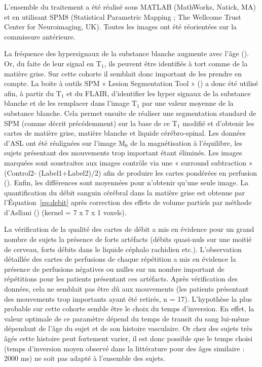 L’ensemble du traitement a été réalisé sous MATLAB (MathWorks, Natick, MA) et en utilisant
SPM8 (Statistical Parametric Mapping ; The Wellcome Trust Center for Neuroimaging, UK). Toutes les
images ont été réorientées sur la commissure antérieure.

La fréquence des hypersignaux de la substance blanche augmente avec l’âge (\cite{Awad1987}). Or, du faite
de leur signal en T$_1$, ils peuvent être identifiés à tort comme de la matière grise. Sur cette cohorte il
semblait donc important de les prendre en compte. La boite à outils SPM « Lesion Segmentation Tool »
(\cite{Schmidt2012}) a donc été utilisé afin, à partir du T$_1$ et du FLAIR, d’identifier les hyper signaux de la substance
blanche et de les remplacer dans l’image T$_1$ par une valeur moyenne de la substance blanche. Cela
permet ensuite de réaliser une segmentation standard de SPM (comme décrit précédemment) sur la
base de ce T$_1$ modifié et d’obtenir les cartes de matière grise, matière blanche et liquide cérébro-spinal. Les données d’ASL ont été réalignées sur l’image M$_0$ de la magnétisation à l’équilibre, les sujets
présentant des mouvements trop important étant éliminés. Les images marquées sont soustraites aux
images contrôle via une « surround subtraction » (Control2- (Label1+Label2)/2) afin de produire les
cartes pondérées en perfusion (\cite{Wang2008}). Enfin, les différences sont moyennées pour n’obtenir qu’une
seule image. La quantification du débit sanguin cérébral dans la matière grise est obtenue par
l’Équation~\ref{eq:debit} après correction des effets de volume partiels par méthode d’Asllani (\cite{Asllani2008}) (kernel = 7 x
7 x 1 voxels).

La vérification de la qualité des cartes de débit a mis en évidence pour un grand nombre de
sujets la présence de forts artéfacts (débits quasi-nuls sur une moitié de cerveau, forts débits dans le
liquide céphalo rachidien etc.). L’observation détaillée des cartes de perfusions de chaque répétition
a mis en évidence la présence de perfusions négatives ou nulles sur un nombre important de
répétitions pour les patients présentant ces artéfacts. Après vérification des données, cela ne semblait
pas être dû aux mouvements (les patients présentant des mouvements trop importants ayant été
retirés, n = 17). L’hypothèse la plus probable sur cette cohorte semble être le choix du temps
d’inversion. En effet, la valeur optimale de ce paramètre dépend du temps de transit du sang lui-même
dépendant de l’âge du sujet et de son histoire vasculaire. Or chez des sujets très âgés cette histoire
peut fortement varier, il est donc possible que le temps choisi (temps d’inversion moyen observé dans
la littérature pour des âges similaire : 2000 ms) ne soit pas adapté à l’ensemble des sujets.

